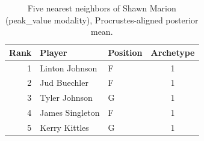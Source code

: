 \begin{table}[htbp]
  \centering\small
  \begin{tabular}{rllc}
    \toprule
    Rank & Player & Position & Archetype \\
    \midrule
    1 & Linton Johnson & F & 1 \\
    2 & Jud Buechler & F & 1 \\
    3 & Tyler Johnson & G & 1 \\
    4 & James Singleton & F & 1 \\
    5 & Kerry Kittles & G & 1 \\
    \bottomrule
  \end{tabular}
  \caption{Five nearest neighbors of Shawn Marion (peak_value modality), Procrustes-aligned posterior mean.}
  \label{tab:Shawn_Marion_neighbors_peak_value}
\end{table}

